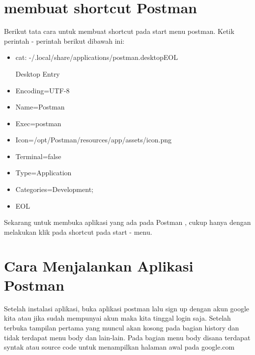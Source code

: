 \documentclass[12pt,a4paper]{article}
\begin{document}
\section{membuat shortcut Postman}
Berikut tata cara untuk membuat shortcut pada start menu postman.  Ketik perintah - perintah berikut dibawah ini:
\begin{itemize}
\item cat: -/.local/share/applications/postman.desktopEOL
\item [Desktop Entry]
\item Encoding=UTF-8
\item Name=Postman
\item Exec=postman
\item Icon=/opt/Postman/resources/app/assets/icon.png
\item Terminal=false
\item Type=Application
\item Categories=Development;
 \item EOL
\end{itemize}


Sekarang untuk membuka aplikasi yang ada pada Postman , cukup hanya dengan melakukan klik pada shortcut pada start - menu. 

\section{Cara Menjalankan Aplikasi Postman}
Setelah instalasi aplikasi, buka aplikasi postman lalu sign up dengan akun google kita atau jika sudah mempunyai akun maka kita tinggal login saja. Setelah terbuka tampilan pertama yang muncul akan kosong pada bagian history dan tidak terdapat menu body dan lain-lain. Pada bagian menu body disana terdapat syntak atau source code untuk menampilkan halaman awal pada google.com
\end{document}

